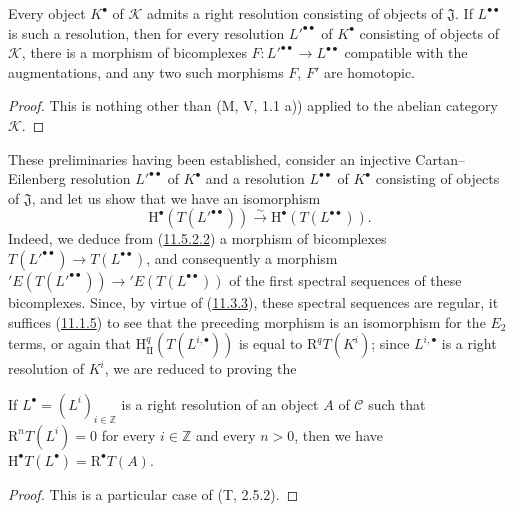 \begin{corollary}[11.5.2.2]
\label{0.11.5.2.2}
Every object $K^\bullet$ of $\mathcal K$ admits a right resolution consisting
of objects of $\mathfrak J$. If $L^{\bullet\bullet}$ is such a resolution,
then for every resolution $L'^{\bullet\bullet}$ of $K^\bullet$ consisting of objects
of $\mathcal K$, there is a morphism of bicomplexes
$F:L'^{\bullet\bullet}\to L^{\bullet\bullet}$ compatible with the
augmentations, and any two such morphisms $F$, $F'$ are homotopic.
\end{corollary}

\begin{proof}
This is nothing other than (M, V, 1.1 a)) applied to the abelian category
$\mathcal K$.
\end{proof}

\begin{env}[11.5.2.3]
\label{0.11.5.2.3}
These preliminaries having been established, consider an injective
Cartan--Eilenberg resolution $L'^{\bullet\bullet}$ of $K^\bullet$ and a
resolution $L^{\bullet\bullet}$ of $K^\bullet$ consisting of objects of
$\mathfrak J$, and let us show that we have an isomorphism
\[
  \mathrm H^\bullet(T(L'^{\bullet\bullet}))\xrightarrow{\sim}
  \mathrm H^\bullet(T(L^{\bullet\bullet})).
\]
Indeed, we deduce from (\hyperref[0.11.5.2.2]{11.5.2.2}) a morphism of
bicomplexes $T(L'^{\bullet\bullet})\to T(L^{\bullet\bullet})$, and consequently
a morphism
$'E(T(L'^{\bullet\bullet}))\to{}'E(T(L^{\bullet\bullet}))$ of the first
spectral sequences of these bicomplexes. Since, by virtue of
(\hyperref[0.11.3.3]{11.3.3}), these spectral sequences are regular, it
suffices (\hyperref[0.11.1.5]{11.1.5}) to see that the preceding morphism is
an isomorphism for the $E_2$ terms, or again that
$\mathrm H_{\mathrm{II}}^q(T(L^{i,\bullet}))$ is equal to
$\mathrm R^qT(K^i)$; since $L^{i,\bullet}$ is a right resolution of
$K^i$, we are reduced to proving the
\end{env}

\begin{lemma}[11.5.2.4]
\label{0.11.5.2.4}
If $L^\bullet=(L^i)_{i\in\mathbb Z}$ is a right resolution of an object $A$
of $\mathcal C$ such that $\mathrm R^nT(L^i)=0$ for every $i\in\mathbb Z$ and
every $n>0$, then we have
$\mathrm H^\bullet T(L^\bullet)=\mathrm R^\bullet T(A)$.
\end{lemma}

\begin{proof}
This is a particular case of (T, 2.5.2).
\end{proof}

